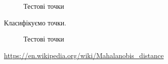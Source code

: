 \documentclass[a4paper,12pt]{article}
\begin{document}
\begin{figure}[h!]
	\caption{Тестові точки}
\end{figure}

\newpage
Класифікуємо точки.

\begin{figure}
	\caption{Тестові точки}
\end{figure}


\newpage
{}
\begin{thebibliography}{}
	 \href{https://en.wikipedia.org/wiki/Mahalanobis_distance}{https://en.wikipedia.org/wiki/Mahalanobis\_distance}
\end{thebibliography}
\end{document}
